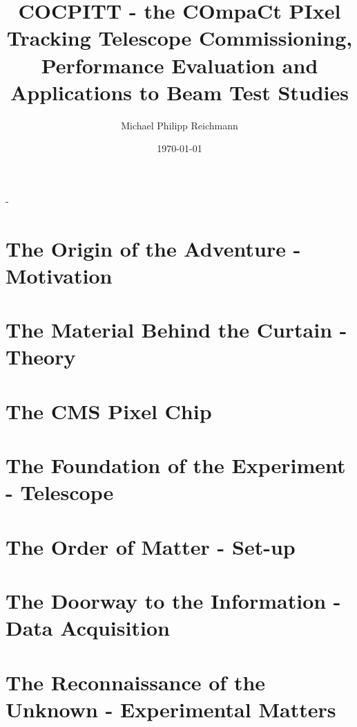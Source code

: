 \documentclass[british,11pt,a4paper]{memoir}
\title{COCPITT - the COmpaCt PIxel Tracking Telescope\s
	\LARGE Commissioning, Performance Evaluation and Applications to Beam Test Studies
}
\author{Michael Philipp Reichmann}
\date{\today}
\begin{document}
\frontmatter
\begin{titlingpage}
  \calccentering{\unitlength}
  \begin{adjustwidth*}{\unitlength-24pt}{-\unitlength-24pt}
    \maketitle
  \end{adjustwidth*}
\end{titlingpage}

\cleartorecto
\tableofcontents
\mainmatter
\chapter{The Origin of the Adventure - Motivation}

\chapter{The Material Behind the Curtain - Theory}

\chapter{The CMS Pixel Chip}

\chapter{The Foundation of the Experiment - Telescope}

\chapter{The Order of Matter - Set-up}

\chapter{The Doorway to the Information - Data Acquisition}

\chapter{The Reconnaissance of the Unknown - Experimental Matters}
\label{sexp}
\end{document}
